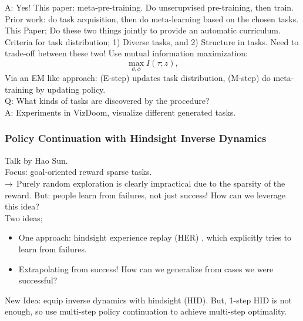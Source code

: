 A: Yes! This paper: meta-pre-training. Do unserupvised pre-training, then train. \\

Prior work: do task acquisition, then do meta-learning based on the chosen tasks. \\

This Paper; Do these two things jointly to provide an automatic curriculum. \\

Criteria for task distribution; 1) Diverse tasks, and 2) Structure in tasks. Need to trade-off between these two! Use mutual information maximization:
\[
\max_{\theta, \phi} I(\tau; z),
\]
Via an EM like approach: (E-step) updates task distribution, (M-step) do meta-training by updating policy. \\

Q: What kinds of tasks are discovered by the procedure? \\

A: Experiments in VizDoom, visualize different generated tasks. \\

\subsubsection{Policy Continuation with Hindsight Inverse Dynamics \cite{sun2019policy}}

Talk by Hao Sun. \\

Focus: goal-oriented reward sparse tasks. \\

$\rightarrow$ Purely random exploration is clearly impractical due to the sparsity of the reward. But: people learn from failures, not just success! How can we leverage this idea? \\

Two ideas;
\begin{itemize}
    \item One approach: hindsight experience replay (HER) \cite{andrychowicz2017hindsight}, which explicitly tries to learn from failures.
    \item Extrapolating from success! How can we generalize from cases we were successful?
\end{itemize}

New Idea: equip inverse dynamics with hindsight (HID). But, 1-step HID is not enough, so use multi-step policy continuation to achieve multi-step optimality. \\

